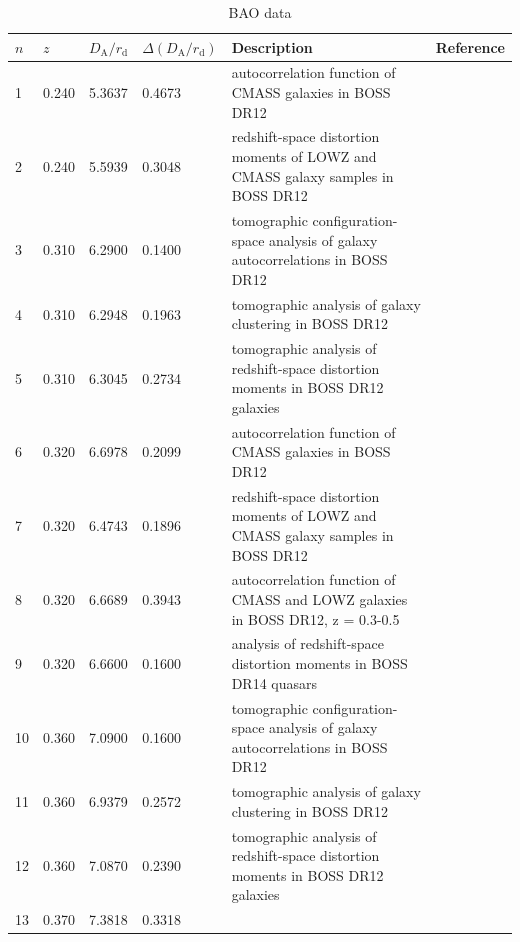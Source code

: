 \begin{table}
  \caption{BAO data}
  \label{tab:2a}
  \begin{tabular}{llllp{70mm}l}
    $n$ & $z$ & $D_\mathrm{A}/r_\mathrm{d}$ & $\Delta(D_\mathrm{A}/r_\mathrm{d})$ &
    Description & Reference \\
    \hline
     1 & 0.240 &  5.3637 & 0.4673 &
    autocorrelation function of CMASS galaxies in BOSS DR12 &
    \cite{2016MNRAS.461.3781C} \\
     2 & 0.240 &  5.5939 & 0.3048 &
    redshift-space distortion moments of LOWZ and CMASS galaxy samples in BOSS DR12 &
    \cite{2017MNRAS.471.2370C} \\
     3 & 0.310 &  6.2900 & 0.1400 &
    tomographic configuration-space analysis of galaxy autocorrelations in BOSS DR12 &
    \cite{2017MNRAS.469.3762W} \\
     4 & 0.310 &  6.2948 & 0.1963 &
    tomographic analysis of galaxy clustering in BOSS DR12 &
    \cite{2018MNRAS.481.3160W} \\
     5 & 0.310 &  6.3045 & 0.2734 &
    tomographic analysis of redshift-space distortion moments in BOSS DR12 galaxies &
    \cite{2017MNRAS.466..762Z} \\
     6 & 0.320 &  6.6978 & 0.2099 &
    autocorrelation function of CMASS galaxies in BOSS DR12 &
    \cite{2016MNRAS.461.3781C} \\
     7 & 0.320 &  6.4743 & 0.1896 &
    redshift-space distortion moments of LOWZ and CMASS galaxy samples in BOSS DR12 &
    \cite{2017MNRAS.471.2370C} \\
     8 & 0.320 &  6.6689 & 0.3943 &
    autocorrelation function of CMASS and LOWZ galaxies in BOSS DR12, z = 0.3-0.5 &
    \cite{2016MNRAS.457.1770C} \\
     9 & 0.320 &  6.6600 & 0.1600 &
    analysis of redshift-space distortion moments in BOSS DR14 quasars &
    \cite{2018MNRAS.477.1604G} \\
    10 & 0.360 &  7.0900 & 0.1600 &
    tomographic configuration-space analysis of galaxy autocorrelations in BOSS DR12 &
    \cite{2017MNRAS.469.3762W} \\
    11 & 0.360 &  6.9379 & 0.2572 &
    tomographic analysis of galaxy clustering in BOSS DR12 &
    \cite{2018MNRAS.481.3160W} \\
    12 & 0.360 &  7.0870 & 0.2390 &
    tomographic analysis of redshift-space distortion moments in BOSS DR12 galaxies &
    \cite{2017MNRAS.466..762Z} \\
    13 & 0.370 &  7.3818 & 0.3318 &

\end{tabular}
\end{table}
